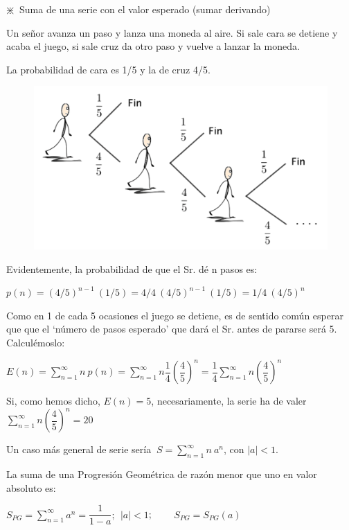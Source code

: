 \vspace{5mm} %
\begin{myexampleblock}
	{$ \divideontimes \  $ Suma de una serie con el valor esperado (sumar derivando)}
	
	\begin{multicols}{2}
		Un señor avanza un paso y lanza una moneda al aire. Si sale cara se detiene y acaba el juego, si sale cruz da otro paso y vuelve a lanzar la moneda. 
		
		La probabilidad de cara es 1/5 y la de cruz 4/5.
	
	\begin{figure}[H]
	\centering
	\includegraphics[width=.5\textwidth]{imagenes/imagenes04/T04IM36.png}
	\end{figure}
	\end{multicols}

Evidentemente, la probabilidad de que el Sr. dé n pasos es: 

$p(n)=(4/5)^{n-1}\ (1/5)=4/4\ (4/5)^{n-1}\ (1/5)= 1/4\ (4/5)^n$

Como en 1 de cada 5 ocasiones el juego se detiene, es de sentido común esperar que que el `número de pasos esperado' que dará el Sr. antes de pararse será 5. Calculémoslo:

\vspace{2mm} $E(n) \displaystyle =\sum_{n=1}^\infty n\ p(n)=\sum_{n=1}^{\infty} n \dfrac 1 4 \left( \dfrac 4 5 \right) ^n = \dfrac 1 4 \sum_{n=1}^{\infty} n \left( \dfrac 4 5 \right) ^n$

\vspace{2mm} Si, como hemos dicho, $E(n)=5$, necesariamente, la serie ha de valer $\displaystyle \sum_{n=1}^{\infty} n \left( \dfrac 4 5 \right) ^n=20$

\vspace{2mm}  Un caso más general de serie sería $\ S=\displaystyle \sum_{n=1}^\infty n \ a^n$, con $|a|<1$.

\vspace{2mm} La suma de una Progresión Geométrica de razón menor que uno en valor absoluto es:

\vspace{2mm} $\displaystyle S_{PG}=\sum_{n=1}^\infty a^n=\dfrac 1 {1-a};\ \ |a|<1$; $\qquad S_{PG}=S_{PG}(a)$


\end{myexampleblock}
